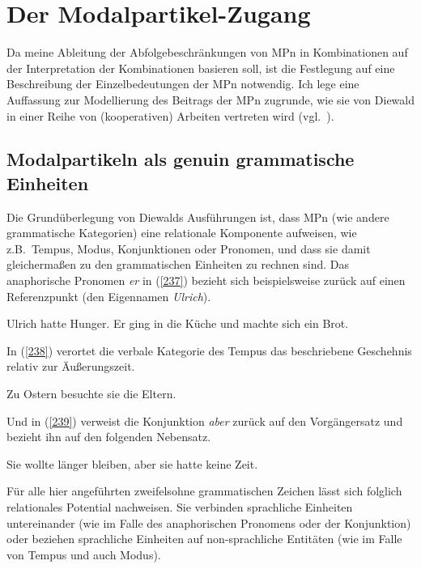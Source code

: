 \section{Der Modalpartikel-Zugang}
\label{sec:zugang}
Da meine Ableitung der Abfolgebeschränkungen von MPn in Kombinationen auf der Interpretation der Kombinationen basieren soll, ist die Festlegung auf eine Beschreibung der Einzelbedeutungen der MPn notwendig. Ich lege eine Auffassung zur Modellierung des Beitrags der MPn zugrunde, wie sie von Diewald in einer Reihe von (kooperativen) Arbeiten vertreten wird (vgl.\ \citealt{Diewald1997, Diewald1999a, Diewald2006, Diewald2007, Diewald1998, Diewald2010}).

\subsection{Modalpartikeln als genuin grammatische Einheiten}
Die Grundüberlegung von Diewalds Ausführungen ist, dass MPn (wie andere grammatische Kategorien) eine relationale Komponente aufweisen, wie z.B.\ Tempus, Modus, Konjunktionen oder Pronomen, und dass sie damit gleichermaßen zu den grammatischen Einheiten zu rechnen sind. Das anaphorische Pronomen  \textit{er} in (\ref{237}) bezieht sich beispielsweise zurück auf einen Referenzpunkt (den Eigennamen \textit{Ulrich}).
	
\begin{exe}
	\ex\label{237} 
	Ulrich hatte Hunger. Er ging in die Küche und machte sich ein Brot.
\end{exe}	
In (\ref{238}) verortet die verbale Kategorie des Tempus  das beschriebene Geschehnis relativ zur Äußerungszeit. 

\begin{exe}
	\ex\label{238} 
	Zu Ostern besuchte sie die Eltern.
\end{exe}
Und in (\ref{239}) verweist die Konjunktion  \textit{aber} zurück auf den Vorgängersatz und bezieht ihn auf den folgenden Nebensatz.

\begin{exe}
	\ex\label{239} 
	Sie wollte länger bleiben, aber sie hatte keine Zeit.
\end{exe}
Für alle hier angeführten zweifelsohne grammatischen Zeichen lässt sich folglich relationales Potential nachweisen. Sie verbinden sprachliche Einheiten unter\-einander (wie im Falle des anaphorischen Pronomens oder der Konjunktion) oder beziehen sprachliche Einheiten auf non-sprachliche Entitäten (wie im Falle von Tempus und auch Modus).

